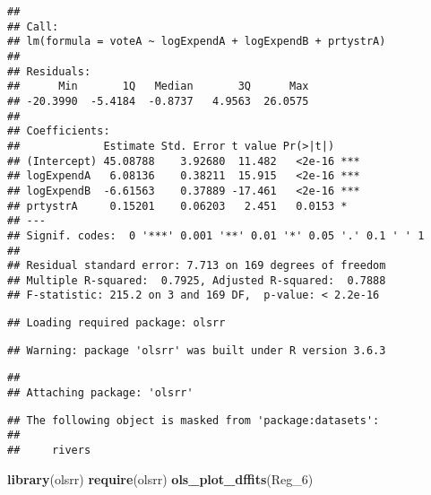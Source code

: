 \documentclass[
]{article}
\newenvironment{Shaded}{\begin{snugshade}}{\end{snugshade}}
\newcommand{\ControlFlowTok}[1]{\textcolor[rgb]{0.13,0.29,0.53}{\textbf{#1}}}
\newcommand{\DecValTok}[1]{\textcolor[rgb]{0.00,0.00,0.81}{#1}}
\newcommand{\KeywordTok}[1]{\textcolor[rgb]{0.13,0.29,0.53}{\textbf{#1}}}
\newcommand{\NormalTok}[1]{#1}
\newcommand{\OperatorTok}[1]{\textcolor[rgb]{0.81,0.36,0.00}{\textbf{#1}}}
\newcommand{\StringTok}[1]{\textcolor[rgb]{0.31,0.60,0.02}{#1}}
\begin{document}
\begin{verbatim}
## 
## Call:
## lm(formula = voteA ~ logExpendA + logExpendB + prtystrA)
## 
## Residuals:
##      Min       1Q   Median       3Q      Max 
## -20.3990  -5.4184  -0.8737   4.9563  26.0575 
## 
## Coefficients:
##             Estimate Std. Error t value Pr(>|t|)    
## (Intercept) 45.08788    3.92680  11.482   <2e-16 ***
## logExpendA   6.08136    0.38211  15.915   <2e-16 ***
## logExpendB  -6.61563    0.37889 -17.461   <2e-16 ***
## prtystrA     0.15201    0.06203   2.451   0.0153 *  
## ---
## Signif. codes:  0 '***' 0.001 '**' 0.01 '*' 0.05 '.' 0.1 ' ' 1
## 
## Residual standard error: 7.713 on 169 degrees of freedom
## Multiple R-squared:  0.7925, Adjusted R-squared:  0.7888 
## F-statistic: 215.2 on 3 and 169 DF,  p-value: < 2.2e-16
\end{verbatim}

\begin{Shaded}
\end{Shaded}

\begin{verbatim}
## Loading required package: olsrr
\end{verbatim}

\begin{verbatim}
## Warning: package 'olsrr' was built under R version 3.6.3
\end{verbatim}

\begin{verbatim}
## 
## Attaching package: 'olsrr'
\end{verbatim}

\begin{verbatim}
## The following object is masked from 'package:datasets':
## 
##     rivers
\end{verbatim}

\begin{Shaded}
\begin{Highlighting}[]
\KeywordTok{library}\NormalTok{(olsrr)}
\KeywordTok{require}\NormalTok{(olsrr)}
\KeywordTok{ols_plot_dffits}\NormalTok{(Reg_}\DecValTok{6}\NormalTok{)}
\end{Highlighting}
\end{Shaded}
\end{document}
